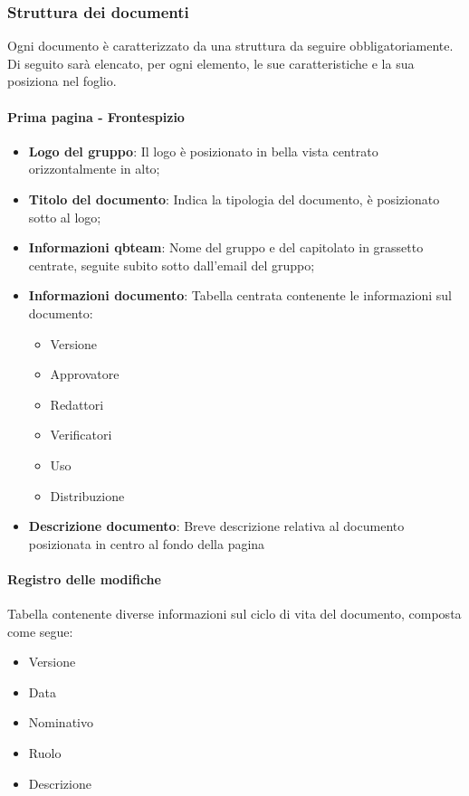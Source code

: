 \subsubsection{Struttura dei documenti}
Ogni documento è caratterizzato da una struttura da seguire obbligatoriamente.
Di seguito sarà elencato, per ogni elemento, le sue caratteristiche e la sua posiziona nel foglio.

\paragraph{Prima pagina - Frontespizio} 
\begin{itemize}
\item \textbf{Logo del gruppo}: Il logo è posizionato in bella vista centrato orizzontalmente in alto;
\item \textbf{Titolo del documento}: Indica la tipologia del documento, è posizionato sotto al logo;
\item \textbf{Informazioni qbteam}: Nome del gruppo e del capitolato in grassetto centrate, seguite subito sotto dall'email del gruppo; 
\item \textbf{Informazioni documento}: Tabella centrata contenente le informazioni sul documento:
\begin{itemize}
\item Versione
\item Approvatore
\item Redattori
\item Verificatori
\item Uso
\item Distribuzione
\end{itemize}
\item \textbf{Descrizione documento}: Breve descrizione relativa al documento posizionata in centro al fondo della pagina
\end{itemize}

\paragraph{Registro delle modifiche}
Tabella contenente diverse informazioni sul ciclo di vita del documento, composta come segue:
\begin{itemize}
\item Versione
\item Data
\item Nominativo
\item Ruolo
\item Descrizione
\end{itemize}

